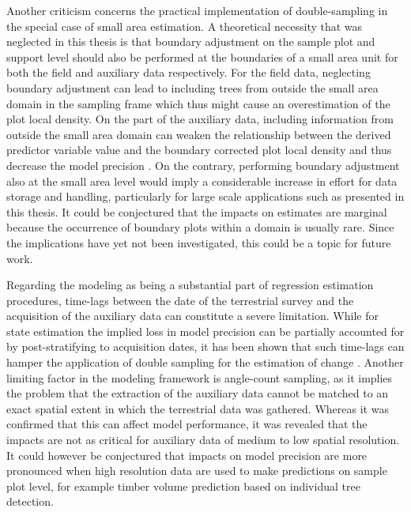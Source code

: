 Another criticism concerns the practical implementation of double-sampling in the special case of small area estimation. A theoretical necessity that was neglected in this thesis is that boundary adjustment on the sample plot and support level should also be performed at the boundaries of a small area unit for both the field and auxiliary data respectively. For the field data, neglecting boundary adjustment can lead to including trees from outside the small area domain in the sampling frame which thus might cause an overestimation of the plot local density. On the part of the auxiliary data, including information from outside the small area domain can weaken the relationship between the derived predictor variable value and the boundary corrected plot local density and thus decrease the model precision \citep{mandallaz2013b}. On the contrary, performing boundary adjustment also at the small area level would imply a considerable increase in effort for data storage and handling, particularly for large scale applications such as presented in this thesis. It could be conjectured that the impacts on estimates are marginal because the occurrence of boundary plots within a domain is usually rare. Since the implications have yet not been investigated, this could be a topic for future work.\par

Regarding the modeling as being a substantial part of regression estimation procedures, time-lags between the date of the terrestrial survey and the acquisition of the auxiliary data can constitute a severe limitation. While for state estimation the implied loss in model precision can be partially accounted for by post-stratifying to acquisition dates, it has been shown that such time-lags can hamper the application of double sampling for the estimation of change \citep{massey2015_thesis}. Another limiting factor in the modeling framework is angle-count sampling, as it implies the problem that the extraction of the auxiliary data cannot be matched to an exact spatial extent in which the terrestrial data was gathered. Whereas it was confirmed that this can affect model performance, it was revealed that the impacts are not as critical for auxiliary data of medium to low spatial resolution. It could however be conjectured that impacts on model precision are more pronounced when high resolution data are used to make predictions on sample plot level, for example timber volume prediction based on individual tree detection.\par

